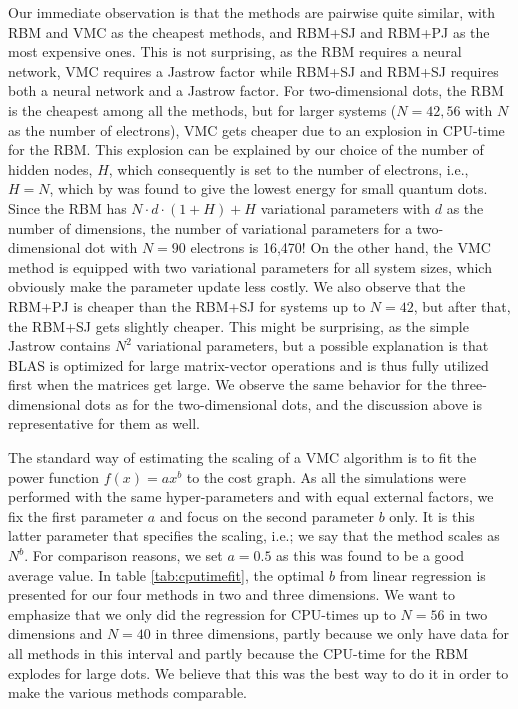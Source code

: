 Our immediate observation is that the methods are pairwise quite similar, with RBM and VMC as the cheapest methods, and RBM+SJ and RBM+PJ as the most expensive ones. This is not surprising, as the RBM requires a neural network, VMC requires a Jastrow factor while RBM+SJ and RBM+SJ requires both a neural network and a Jastrow factor. For two-dimensional dots, the RBM is the cheapest among all the methods, but for larger systems ($N=42,56$ with $N$ as the number of electrons), VMC gets cheaper due to an explosion in CPU-time for the RBM. This explosion can be explained by our choice of the number of hidden nodes, $H$, which consequently is set to the number of electrons, i.e., $H=N$, which by \citet{nordhagen_computational_2018} was found to give the lowest energy for small quantum dots. Since the RBM has $N\cdot d\cdot (1+H)+H$ variational parameters with $d$ as the number of dimensions, the number of variational parameters for a two-dimensional dot with $N=90$ electrons is 16,470! On the other hand, the VMC method is equipped with two variational parameters for all system sizes, which obviously make the parameter update less costly. We also observe that the RBM+PJ is cheaper than the RBM+SJ for systems up to $N=42$, but after that, the RBM+SJ gets slightly cheaper. This might be surprising, as the simple Jastrow contains $N^2$ variational parameters, but a possible explanation is that BLAS is optimized for large matrix-vector operations and is thus fully utilized first when the matrices get large. We observe the same behavior for the three-dimensional dots as for the two-dimensional dots, and the discussion above is representative for them as well.

The standard way of estimating the scaling of a VMC algorithm is to fit the power function $f(x)=ax^b$ to the cost graph. As all the simulations were performed with the same hyper-parameters and with equal external factors, we fix the first parameter $a$ and focus on the second parameter $b$ only. It is this latter parameter that specifies the scaling, i.e.; we say that the method scales as $N^b$. For comparison reasons, we set $a=0.5$ as this was found to be a good average value. In table \eqref{tab:cputimefit}, the optimal $b$ from linear regression is presented for our four methods in two and three dimensions. We want to emphasize that we only did the regression for CPU-times up to $N=56$ in two dimensions and $N=40$ in three dimensions, partly because we only have data for all methods in this interval and partly because the CPU-time for the RBM explodes for large dots. We believe that this was the best way to do it in order to make the various methods comparable. 

